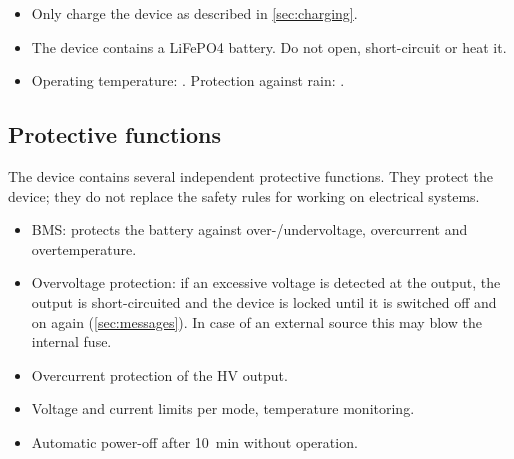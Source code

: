 \begin{caution}
    \begin{itemize}
        \item Only charge the device as described in \autoref{sec:charging}.
        \item The device contains a \ac{LiFePO4} battery. Do not open, short-circuit or heat it.
        \item Operating temperature: . Protection against rain: .
    \end{itemize}
\end{caution}

\subsection{Protective functions}
The device contains several independent protective functions. They protect
the device; they do not replace the safety rules for working on electrical systems.
\begin{itemize}
    \item \ac{BMS}: protects the battery against over-/undervoltage, overcurrent and overtemperature.
    \item Overvoltage protection: if an excessive voltage is detected at the output,
          the output is short-circuited and the device is locked until it is switched off
          and on again (\autoref{sec:messages}). In case of an external source this may blow
          the internal fuse.
    \item Overcurrent protection of the \ac{HV} output.
    \item Voltage and current limits per mode, temperature monitoring.
    \item Automatic power-off after \qty{10}{\minute} without operation.
\end{itemize}
